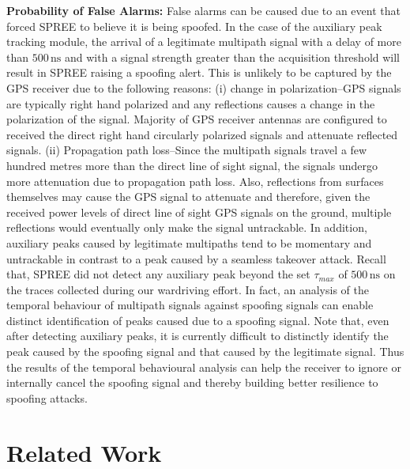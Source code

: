 \documentclass[letterpaper,twocolumn,10pt]{article}
\newcommand{\unit}[1]{\ensuremath{\, \mathrm{#1}}}
\newcommand{\rxname}{SPREE\xspace}
\begin{document}
\noindent\textbf{Probability of False Alarms:} False alarms can be caused due to an event that forced \rxname to believe it is being spoofed. In the case of the auxiliary peak tracking module, the arrival of a legitimate multipath signal with a delay of more than $500\unit{ns}$ and with a signal strength greater than the acquisition threshold will result in \rxname raising a spoofing alert. This is unlikely to be captured by the GPS receiver due to the following reasons: (i) change in polarization--GPS signals are typically right hand polarized and any reflections causes a change in the polarization of the signal. Majority of GPS receiver antennas are configured to received the direct right hand circularly polarized signals and attenuate reflected signals. (ii) Propagation path loss--Since the multipath signals travel a few hundred metres more than the direct line of sight signal, the signals undergo more attenuation due to propagation path loss. Also, reflections from surfaces themselves may cause the GPS signal to attenuate and therefore, given the received power levels of direct line of sight GPS signals on the ground, multiple reflections would eventually only make the signal untrackable. In addition, auxiliary peaks caused by legitimate multipaths tend to be momentary and untrackable in contrast to a peak caused by a seamless takeover attack. Recall that, \rxname did not detect any auxiliary peak beyond the set $\tau_{max}$ of $500\unit{ns}$ on the traces collected during our wardriving effort. In fact, an analysis of the temporal behaviour of multipath signals against spoofing signals can enable distinct identification of peaks caused due to a spoofing signal. Note that, even after detecting auxiliary peaks, it is currently difficult to distinctly identify the peak caused by the spoofing signal and that caused by the legitimate signal. Thus the results of the temporal behavioural analysis can help the receiver to ignore or internally cancel the spoofing signal and thereby building better resilience to spoofing attacks.


















\section{Related Work}
\label{sec:related-work}
\end{document}
